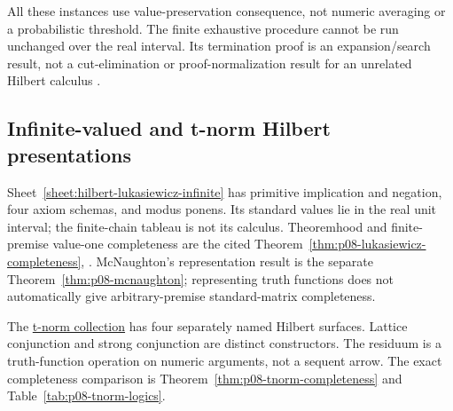All these instances use value-preservation consequence, not numeric
averaging or a probabilistic threshold.  The finite exhaustive procedure
cannot be run unchanged over the real interval.  Its termination proof is
an expansion/search result, not a cut-elimination or proof-normalization
result for an unrelated Hilbert calculus \cite{Kleene1952,Priest1979,
OmoriWansing2017,CignoliDOttavianoMundici2000}.


\subsection{Infinite-valued and t-norm Hilbert presentations}

Sheet~\ref{sheet:hilbert-lukasiewicz-infinite} has primitive implication and
negation, four axiom schemas, and modus ponens.  Its standard values lie in
the real unit interval; the finite-chain tableau is not its calculus.
Theoremhood and finite-premise value-one completeness are the cited
Theorem~\ref{thm:p08-lukasiewicz-completeness}, \cite{Hajek1998}.
McNaughton's representation result is the separate
Theorem~\ref{thm:p08-mcnaughton}; representing truth functions does not
automatically give arbitrary-premise standard-matrix completeness.

The \hyperref[sheet:hilbert-tnorm-logics]{t-norm collection} has four
separately named Hilbert surfaces.  Lattice conjunction and strong
conjunction are distinct constructors.  The residuum is a truth-function
operation on numeric arguments, not a sequent arrow.  The exact completeness
comparison is Theorem~\ref{thm:p08-tnorm-completeness} and
Table~\ref{tab:p08-tnorm-logics}.

